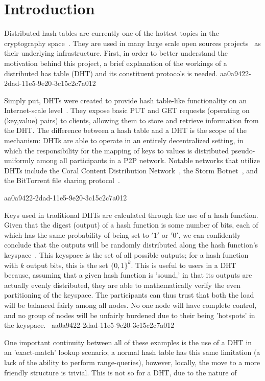 \documentclass[12pt]{article}
\begin{document}
\section{Introduction}
\par Distributed hash tables are currently one of the hottest topics in the cryptography space~\cite{Stoica:2001dj,Rowstron:2001ea,Ratnasamy:2001wn}. They are used in many large scale open sources projects~\cite{Freitas:2013tb,Xu:2010vs,Perfitt:2010fh} as their underlying infrastructure. First, in order to better understand the motivation behind this project, a brief explanation of the workings of a distributed has table (DHT) and its constituent protocols is needed.
aa0a9422-2dad-11e5-9e20-3c15c2c7a012
\par Simply put, DHTs were created to provide hash table-like functionality on an Internet-scale level~\cite{Ratnasamy:2001wn}. They expose basic PUT and GET requests (operating on (key,value) pairs) to clients, allowing them to store and retrieve information from the DHT. The difference between a hash table and a DHT is the scope of the mechanism: DHTs are able to operate in an entirely decentralized setting, in which the responsibility for the mapping of keys to values is distributed pseudo-uniformly among all participants in a P2P network. Notable networks that utilize DHTs include the Coral Content Distribution Network~\cite{Freedman:2004vb}, the Storm Botnet~\cite{Holz:2008uk}, and the BitTorrent file sharing protocol~\cite{Cohen:y1_8mBnw}.

aa0a9422-2dad-11e5-9e20-3c15c2c7a012\par Keys used in traditional DHTs are calculated through the use of a hash function. Given that the digest (output) of a hash function is some number of bits, each of which has the same probability of being set to $'1'$ or $'0'$, we can confidently conclude that the outputs will be randomly distributed along the hash function's keyspace~. This keyspace is the set of all possible outputs; for a hash function with $k$ output bits, this is the set $\{0,1\}^k$. This is useful to users in a DHT because, assuming that a given hash function is 'sound,' in that its outputs are actually evenly distributed, they are able to mathematically verify the even partitioning of the keyspace. The participants can thus trust that both the load will be balanced fairly among all nodes. No one node will have complete control, and no group of nodes will be unfairly burdened due to their being 'hotspots' in the keyspace.~
aa0a9422-2dad-11e5-9e20-3c15c2c7a012
\par One important continuity between all of these examples is the use of a DHT in an 'exact-match' lookup scenario; a normal hash table has this same limitation (a lack of the ability to perform range-queries), however, locally, the move to a more friendly structure is trivial. This is not so for a DHT, due to the nature of
\printbibliography
\end{document}
